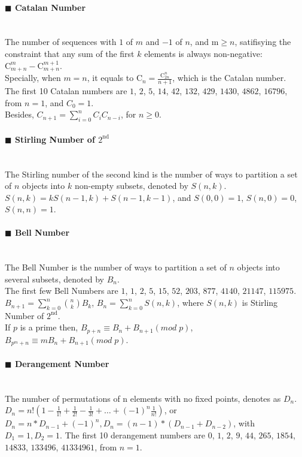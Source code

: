 \documentclass[10pt]{article}
\begin{document}
{\paragraph{$\blacksquare$ Catalan Number}
\noindent \\
The number of sequences with $1$ of $m$ and $-1$ of $n$, and m$\ge n$, satifisying the constraint that any sum of the first $k$ elements is always non-negative: $\mathrm{C}_{m+n}^{m}-\mathrm{C}_{m+n}^{m+1}$. \\
Specially, when $m=n$, it equals to $\mathrm{C}_{n}=\frac{\mathrm{C}_{2n}^{n}}{n+1}$, which is the Catalan number. \\
The first 10 Catalan numbers are $1$, $2$, $5$, $14$, $42$, $132$, $429$, $1430$, $4862$, $16796$, from $n=1$, and $C_0=1$. \\
Besides, $C_{n+1}=\sum_{i=0}^{n}C_{i}C_{n-i}$, for $n\ge 0$.
\paragraph{$\blacksquare$ Stirling Number of $\mathrm{2^{nd}}$}
\noindent \\
The Stirling number of the second kind is the number of ways to partition a set of $n$ objects into $k$ non-empty subsets, denoted by $S(n,k)$. \\
$S(n,k)=kS(n-1,k)+S(n-1,k-1)$, and $S(0,0)=1$, $S(n,0)=0$, $S(n,n)=1$.
\paragraph{$\blacksquare$ Bell Number}
\noindent \\
The Bell Number is the number of ways to partition a set of $n$ objects into several subsets, denoted by $B_{n}$. \\
The first few Bell Numbers are $1$, $1$, $2$, $5$, $15$, $52$, $203$, $877$, $4140$, $21147$, $115975$. \\
$B_{n+1}=\sum_{k=0}^{n} \binom{n}{k}B_k$, $B_n=\sum_{k=0}^{n}S(n,k)$, where $S(n,k)$ is Stirling Number of $\mathrm{2^{nd}}$. \\
If $p$ is a prime then, $B_{p+n} \equiv B_n+B_{n+1} (mod \; p)$, $B_{p^m+n} \equiv m B_n + B_{n+1} (mod \; p)$.
\paragraph{$\blacksquare$ Derangement Number}
\noindent \\
The number of permutations of n elements with no fixed points, denotes as $D_n$. \\
$D_n=n!(1-\frac{1}{1!}+\frac{1}{2!}-\frac{1}{3!}+\ldots +{(-1)}^n\frac{1}{n!})$, or $D_n=n*D_{n-1}+{(-1)}^n,D_n=(n-1)*(D_{n-1}+D_{n-2})$, with $D_1=1,D_2=1$.
The first 10 derangement numbers are $0$, $1$, $2$, $9$, $44$, $265$, $1854$, $14833$, $133496$, $41334961$, from $n=1$.
}
\end{document}

